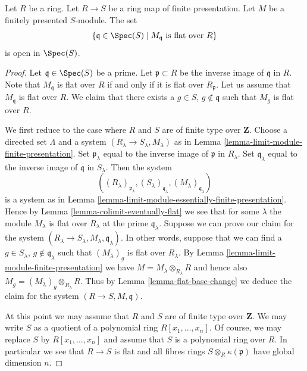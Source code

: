 %
\begin{theorem}
\label{theorem-openness-flatness}
Let $R$ be a ring. Let $R \to S$ be a ring map of finite
presentation. Let $M$ be a finitely presented $S$-module.
The set
$$
\{ \mathfrak q \in \Spec(S) \mid
M_{\mathfrak q}\text{ is flat over }R\}
$$
is open in $\Spec(S)$.
\end{theorem}

\begin{proof}
Let $\mathfrak q \in \Spec(S)$ be a prime.
Let $\mathfrak p \subset R$ be the inverse image of $\mathfrak q$ in $R$.
Note that $M_{\mathfrak q}$ is flat over $R$ if and only if
it is flat over $R_{\mathfrak p}$.
Let us assume that $M_{\mathfrak q}$ is flat over $R$.
We claim that there exists a $g \in S$, $g \not \in \mathfrak q$
such that $M_g$ is flat over $R$.

\medskip\noindent
We first reduce to the case where $R$ and $S$ are
of finite type over $\mathbf{Z}$.
Choose a directed set $\Lambda$ and
a system $(R_\lambda \to S_\lambda, M_\lambda)$
as in Lemma \ref{lemma-limit-module-finite-presentation}.
Set $\mathfrak p_\lambda$ equal to the inverse image of
$\mathfrak p$ in $R_\lambda$.
Set $\mathfrak q_\lambda$ equal to the inverse image of
$\mathfrak q$ in $S_\lambda$.
Then the system
$$
((R_\lambda)_{\mathfrak p_\lambda},
(S_\lambda)_{\mathfrak q_\lambda},
(M_\lambda)_{\mathfrak q_{\lambda}})
$$
is a system as in
Lemma \ref{lemma-limit-module-essentially-finite-presentation}.
Hence by Lemma \ref{lemma-colimit-eventually-flat}
we see that for some $\lambda$ the module
$M_\lambda$ is flat over $R_\lambda$ at the prime
$\mathfrak q_{\lambda}$. Suppose we
can prove our claim for the system
$(R_\lambda \to S_\lambda, M_\lambda, \mathfrak q_{\lambda})$.
In other words, suppose that we can find a $g \in S_\lambda$,
$g \not\in \mathfrak q_\lambda$ such that $(M_\lambda)_g$
is flat over $R_\lambda$. By Lemma \ref{lemma-limit-module-finite-presentation}
we have $M = M_\lambda \otimes_{R_\lambda} R$ and hence
also $M_g = (M_\lambda)_g \otimes_{R_\lambda} R$. Thus by
Lemma \ref{lemma-flat-base-change} we deduce the claim
for the system $(R \to S, M, \mathfrak q)$.

\medskip\noindent
At this point we may assume that $R$ and $S$ are of finite type
over $\mathbf{Z}$. We may write $S$ as a quotient of a
polynomial ring $R[x_1, \ldots, x_n]$. Of course, we may replace
$S$ by $R[x_1, \ldots, x_n]$ and assume that $S$ is a polynomial
ring over $R$. In particular we see that $R \to S$ is flat
and all fibres rings $S \otimes_R \kappa(\mathfrak p)$
have global dimension $n$.


\end{proof}
